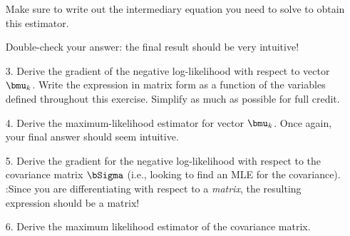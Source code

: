 \documentclass[submit]{harvardml}
\newenvironment{answer}{%
    \color{answergreen}\bf}
  {%
  }
\begin{document}
\begin{enumerate}
\begin{answer}
    \end{answer}

    Make sure to write out the intermediary equation you need
    to solve to obtain this estimator. 

    Double-check your answer: the final
    result should be very intuitive!

  \item[3.] Derive the gradient of the negative log-likelihood with respect to vector $\bmu_k$.
    Write the expression in matrix form as a function of the variables defined
    throughout this exercise. Simplify as much as possible for full credit.

  \item[4.] Derive the maximum-likelihood estimator for vector $\bmu_k$. Once
    again, your final answer should seem intuitive.

  \item[5.] Derive the gradient for the negative log-likelihood with respect to the
    covariance matrix $\bSigma$ (i.e., looking to find an MLE for the covariance). 
    :Since you are differentiating with respect to a \emph{matrix}, the resulting expression should be a matrix!
%
  \item[6.] Derive the maximum likelihood estimator of the covariance matrix.
\end{enumerate}




\end{document}

